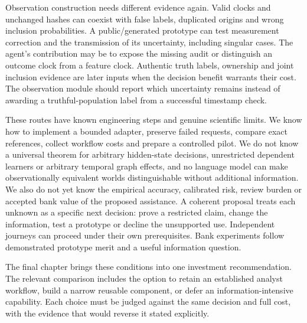 Observation construction needs different evidence again. Valid clocks and
unchanged hashes can coexist with false labels, duplicated origins and wrong
inclusion probabilities. A public/generated prototype can test measurement
correction and the transmission of its uncertainty, including singular cases.
The agent's contribution may be to expose the missing audit or distinguish an
outcome clock from a feature clock. Authentic truth labels, ownership and joint
inclusion evidence are later inputs when the decision benefit warrants their
cost. The observation module should report which uncertainty remains instead
of awarding a truthful-population label from a successful timestamp check.
\citep{exec14_l8_design}

These routes have known engineering steps and genuine scientific limits. We
know how to implement a bounded adapter, preserve failed requests, compare exact
references, collect workflow costs and prepare a controlled pilot. We do not
know a universal theorem for arbitrary hidden-state decisions, unrestricted
dependent learners or arbitrary temporal graph effects, and no language model
can make observationally equivalent worlds distinguishable without additional
information. We also do not yet know the empirical accuracy, calibrated risk,
review burden or accepted bank value of the proposed assistance. A coherent
proposal treats each unknown as a specific next decision: prove a restricted
claim, change the information, test a prototype or decline the unsupported
use. Independent journeys can proceed under their own prerequisites. Bank
experiments follow demonstrated prototype merit and a useful information
question. \citep{exec14_l8_design}

The final chapter brings these conditions into one investment recommendation. The relevant comparison includes the option to retain an established analyst workflow, build a narrow reusable component, or defer an information-intensive capability. Each choice must be judged against the same decision and full cost, with the evidence that would reverse it stated explicitly.

\label{exec14:l8-development-end}
